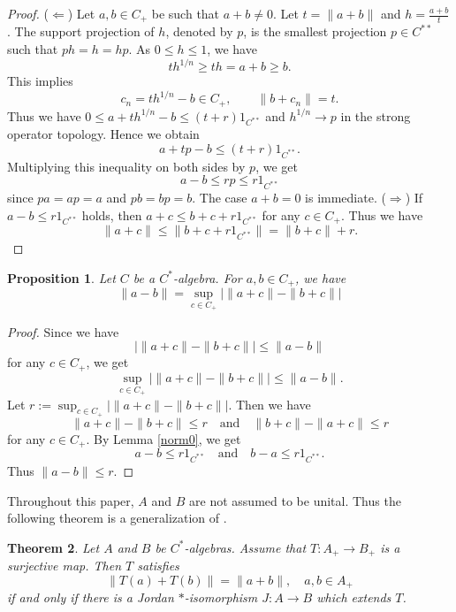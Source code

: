 \documentclass[12pt]{amsart}
\newtheorem{theorem}{Theorem}[section]
\newtheorem{proposition}[theorem]{Proposition}
\theoremstyle{remark}
\begin{document}
\begin{proof}
    ($\Leftarrow$) Let $a,b\in C_+$ be such that $a+b\neq0$. Let $t=\|a+b\|$ and $h=\frac{a+b}{t}$. The support projection of $h$, denoted by $p$, is the smallest projection $p\in C^{**}$ such that $ph=h=hp$. As $0\leq h\leq1$, we have 
    \[ 
    th^{1/n}\geq th=a+b\geq b.
    \]
    This implies 
\[ c_n=th^{1/n}-b\in C_+,\qquad \|b+c_n\|=t. \]
Thus we have $ 0\leq a+th^{1/n}-b\leq(t+r)1_{C^{**}}$ and $h^{1/n}\to p$ in the strong operator topology. Hence we obtain 
\[ a+tp-b\leq(t+r)1_{C^{**}}. \]
Multiplying this inequality on both sides by $p$, we get
\[ a-b\leq rp\leq r1_{C^{**}} \]
since $pa=ap=a$ and $pb=bp=b$. The case $a+b=0$ is immediate. 
 ($\Rightarrow$) If $a-b\leq r1_{C^{**}}$ holds, then $a+c \leq b+c+r1_{C^{**}}$ for any $c \in C_{+}$. Thus we have 
 \[
 \|a+c\| \leq \|b+c+r1_{C^{**}}\|=\|b+c\|+r.
 \]

 \end{proof}
\begin{proposition}\label{norm1}
 Let $C$ be a $C^{*}$-algebra. For $a,b\in C_+$, we have
 \[
  \|a-b\| = \sup_{c\in C_+} \bigl|\|a+c\|-\|b+c\|\bigr|
 \]
\end{proposition}
\begin{proof}
    Since  we have
    \[
    \bigl|\|a+c\|-\|b+c\|\bigr| \le \|a-b\|
    \]
   for any $c \in C_{+}$, we get 
    \[
 \sup_{c\in C_+} \bigl|\|a+c\|-\|b+c\|\bigr| \le \|a-b\|.
 \]
 Let $r:=\sup_{c\in C_+} \bigl|\|a+c\|-\|b+c\|\bigr|$. Then we have
 \[
 \|a+c\|-\|b+c\| \le r \quad \text{and} \quad \|b+c\|-\|a+c\| \le r
 \]
 for any $c \in C_{+}$. By Lemma \ref{norm0}, we get
 \[
 a-b \le r1_{C^{**}} \quad \text{and} \quad b-a \le r1_{C^{**}}.
 \]
 Thus $\|a-b\| \le r$.
\end{proof}

Throughout this paper, $A$ and $B$ are not assumed to be unital. Thus the following theorem is a generalization of \cite[Theorem 2.5]{DongLiMolnarWong}. 
\begin{theorem}\label{additive}
    Let $A$ and $B$ be $C^{*}$-algebras. Assume that $T:A_{+} \to B_{+}$ is a surjective map. Then $T$ satisfies
    \begin{equation}\label{ad1}
        \|T(a)+T(b)\|=\|a+b\|, \quad a, b \in A_{+}
    \end{equation}
    if and only if there is a Jordan $*$-isomorphism $J:A \to B$ which extends $T$.
\end{theorem}
\end{document}
